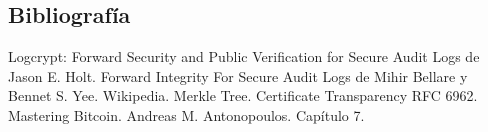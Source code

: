 \subsection{Bibliografía}



\begin{thebibliography}{9}
Logcrypt: Forward Security and Public Verification for Secure Audit Logs de Jason E. Holt.
Forward Integrity For Secure Audit Logs de Mihir Bellare y Bennet S. Yee.
Wikipedia. Merkle Tree.
Certificate Transparency RFC 6962.
Mastering Bitcoin. Andreas M. Antonopoulos. Cap\'itulo 7.

\end{thebibliography}